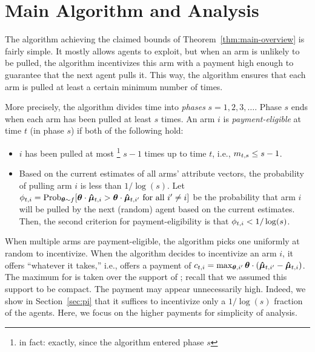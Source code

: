 \section{Main Algorithm and Analysis}
\label{sec:ub}

The algorithm achieving the claimed bounds of
Theorem~\ref{thm:main-overview} is fairly simple.
It mostly allows agents to exploit, but when an arm is   unlikely to be pulled,
the algorithm incentivizes this arm with a payment high enough
to guarantee that the next agent pulls it.
This way, the algorithm ensures that each arm is pulled at least a
certain minimum number of times.

More precisely, the algorithm divides time into \emph{phases}
$s = 1, 2, 3, \ldots$.
Phase $s$ ends when each arm has been pulled at least $s$ times.
An arm $i$ is \emph{payment-eligible} at time $t$ (in phase $s$)
if both of the following hold:

\begin{itemize}
\item $i$ has been pulled at most%
\footnote{in fact: exactly, since the algorithm entered phase $s$}
$s-1$ times up to time $t$, i.e., $m_{t,s} \leq s-1$.
\item Based on the current estimates  of all arms'
attribute vectors, the probability of pulling arm $i$ is less than $1/\log(s)$. 
Let $\PullProb{t}{i} = \Prob[\AgV \sim \AgentDist]{\AgV \cdot \ArmEV{t}{i} > \AgV
  \cdot \ArmEV{t}{i'} \mbox{ for all } i' \neq i}$
be the probability that arm $i$ will be pulled
by the next (random) agent based on the current estimates. 
Then, the second criterion for payment-eligibility is that
$\phi_{t,i} < 1/\log(s)$.
\end{itemize}

When multiple arms are payment-eligible, the algorithm picks one
uniformly at random to incentivize.
When the algorithm decides to incentivize an arm $i$,
it offers ``whatever it takes,'' i.e., offers a payment of
$c_{t,i} = \max_{\bm{\theta},i'} \bm{\theta} \cdot (\bm{\hat{\mu}}_{t,i'} - \bm{\hat{\mu}}_{t,i})$.
The maximum for \AgV is taken over the support of \AgentDist;
recall that we assumed this support to be compact.
The payment  may appear unnecessarily high.
Indeed, we show in Section~\ref{sec:pi} that it suffices to
incentivize only a $1/\log(s)$ fraction of the agents.
Here, we focus on the higher payments for simplicity of analysis.

